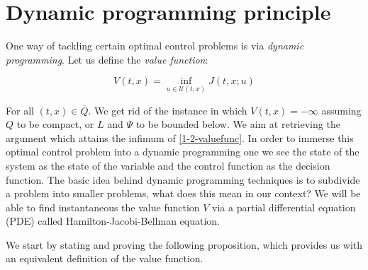 \section{Dynamic programming principle}

One way of tackling certain optimal control problems is via \textit{dynamic programming}. 
Let us define the \textit{value function}:

\begin{equation}\label{1-2-valuefunc}
    V(t,x)=\inf_{u\in \mathcal{U}(t,x)}J(t,x;u)
\end{equation}

For all $(t,x)\in\overline{Q}$. We get rid of the instance in which $V(t,x)=-\infty$ assuming $Q$ to be compact, or $L$ and $\Psi$ to be bounded below.
We aim at retrieving the argument which attains the infimum of \ref*{1-2-valuefunc}. In order to immerse this optimal control problem into 
a dynamic programming one we see the state of the system as the state of the variable and the control function as the decision function.
The basic idea behind dynamic programming techniques is to subdivide a problem into smaller problems, what does this mean in our context?
We will be able to find instantaneous the value function $V$ via a partial differential equation (PDE) called Hamilton-Jacobi-Bellman equation.

We start by stating and proving the following proposition, which provides us with an equivalent definition of the value function.

